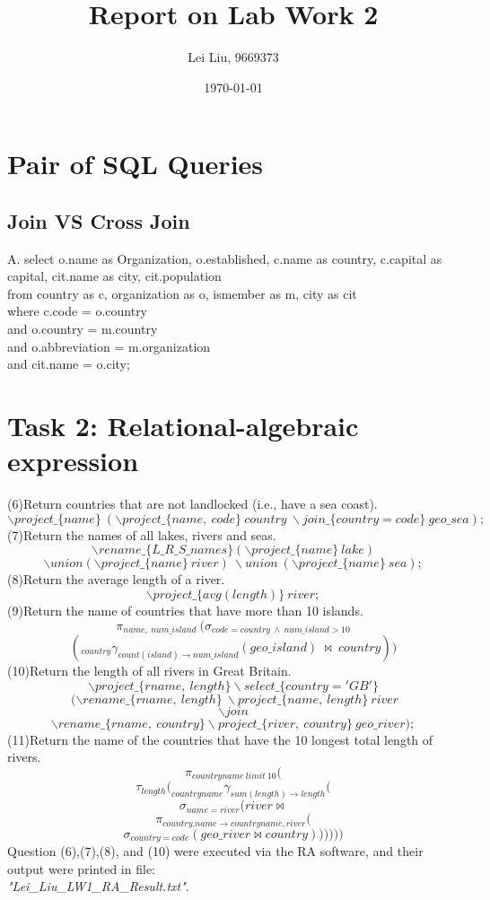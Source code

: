 \documentclass[11pt, twocolumn]{article}
\begin{document}
\title{ Report on Lab Work 2}
\author{Lei Liu, 9669373}
\date{\today}
\maketitle

\section{Pair of SQL Queries}
\subsection{Join VS Cross Join}
A. select o.name as Organization, o.established, c.name as country, c.capital as capital, cit.name as city, cit.population\\
from country as c, organization as o, ismember as m, city as cit\\
where c.code = o.country \\
and o.country = m.country \\
and o.abbreviation = m.organization \\
and cit.name = o.city;

\section{Task 2: Relational-algebraic expression}
(6)Return countries that are not landlocked (i.e., have a sea coast).
$$ \backslash project\_\{name\} \ (\backslash project\_\{name, \ code\}\  country \  \backslash join\_ \{country=code\} \ geo\_sea);$$
(7)Return the names of all lakes, rivers and seas.
$$ \backslash rename\_\{ L\_R\_S\_names\} (  \backslash project\_\{name\} \ lake) $$$$ \backslash union ( \backslash project\_\{name\} \ river) \ \backslash union \   ( \backslash project\_\{name\} \ sea);$$
(8)Return the average length of a river.
$$ \backslash project\_\{avg(length)\} \ river;$$
(9)Return the name of countries that have more than 10 islands.
$$\pi_{name, \ num\_island} \  ( \sigma_{code=country \ \wedge \ num\_island>10} $$$$ ( _{country} \gamma_{count(island) \rightarrow num\_island } (geo\_island ) \ \bowtie  \ country ) )$$
\newpage
(10)Return the length of all rivers in Great Britain.
$$ \backslash project\_\{rname, \ length\}  \backslash select\_\{country = 'GB'\} $$$$ \ ( \backslash rename\_\{rname, \ length\} \   \backslash project\_\{name, \  length\} \ river $$$$  \backslash join $$$$  \backslash rename\_\{rname, \  country\}  \backslash project\_\{river, \ country\} \ geo\_river);$$
(11)Return the name of the countries that have the 10 longest total length of rivers.
$$\pi_{countryname \ limit \ 10}( $$$$
\tau _{length}(
_{countryname} \gamma _{sum(length) \rightarrow length}( $$$$ 
\sigma_{name=river}(
river\bowtie $$$$
\pi_{country.name\rightarrow countryname, river}( $$$$
\sigma_{country=code}(
geo\_river \bowtie country))))))$$
Question (6),(7),(8), and (10) were executed via the RA software, and their output were printed in file:\\ \textit{"Lei\_Liu\_LW1\_RA\_Result.txt"}.
\end{document}

